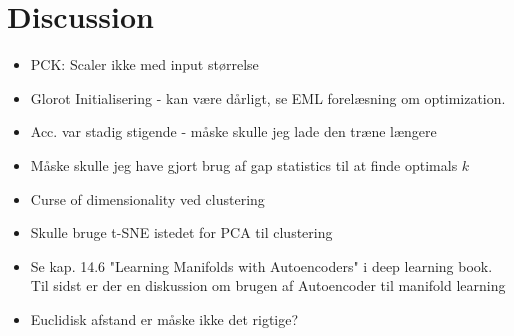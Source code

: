 \documentclass[./main.tex]{subfiles}
\begin{document}
\section{Discussion}
\begin{itemize}
    \item PCK: Scaler ikke med input størrelse
    \item Glorot Initialisering - kan være dårligt, se EML forelæsning om optimization.
    \item Acc. var stadig stigende - måske skulle jeg lade den træne længere
    \item Måske skulle jeg have gjort brug af gap statistics til at finde optimals $k$
    \item Curse of dimensionality ved clustering
    \item Skulle bruge t-SNE istedet for PCA til clustering
    \item Se kap. 14.6 "Learning Manifolds with Autoencoders" i deep learning book. Til sidst er der en diskussion om brugen af Autoencoder til manifold learning
    \item Euclidisk afstand er måske ikke det rigtige?
\end{itemize}
\end{document}

